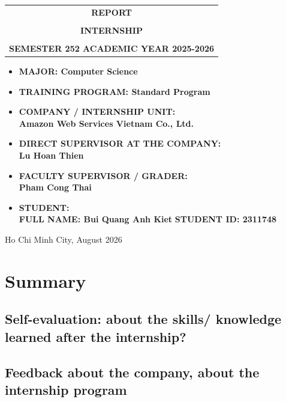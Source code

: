 \documentclass[a4paper]{article}
\begin{document}
\begin{titlepage}
\begin{center}
\begin{tabular}{c}
\multicolumn{1}{c}{\textbf{{\LARGE REPORT}}}\\
\\{\textbf{{\LARGE INTERNSHIP}}}
\\
\\
\textbf{\Large SEMESTER 252 ACADEMIC YEAR 2025-2026} \\
\end{tabular}
\end{center}
\vspace{0.5cm}
\begin{itemize}
\renewcommand\labelitemi{--}
    \item \Large \textbf{MAJOR: Computer Science}
    \item \Large \textbf{TRAINING PROGRAM: Standard Program}
\end{itemize}
\vspace{0.7cm}
\begin{itemize}
\renewcommand\labelitemi{--}
    \item \Large \textbf{COMPANY / INTERNSHIP UNIT:}
    \\ \Large \textbf{Amazon Web Services Vietnam Co., Ltd.}
    \item \Large \textbf{DIRECT SUPERVISOR AT THE COMPANY:}
    \\ \Large \textbf{Lu Hoan Thien}
    \item \Large \textbf{FACULTY SUPERVISOR / GRADER:}
    \\ \Large \textbf{Pham Cong Thai}
    \item \Large \textbf{STUDENT:}
    \\ \Large \textbf{FULL NAME: Bui Quang Anh Kiet} \textbf{STUDENT ID: 2311748}
\end{itemize}
\vspace{0.5cm}
\begin{center}
{\Large Ho Chi Minh City, August 2026}
\end{center}
\end{titlepage}

\newpage
\tableofcontents
\newpage





\newpage
\section{Summary}
\subsection{Self-evaluation: about the skills/ knowledge learned after the internship?}

\subsection{Feedback about the company, about the internship program}


\end{document}
